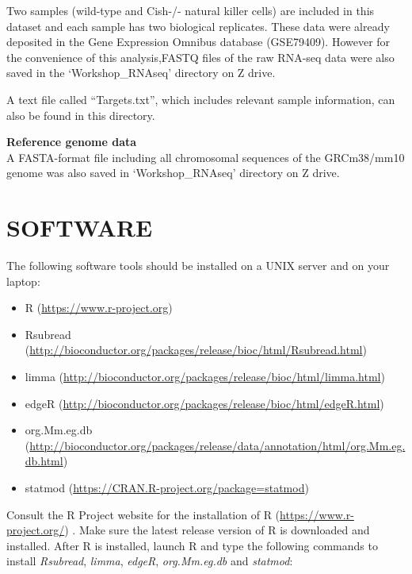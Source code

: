 \documentclass[]{book}
\providecommand{\tightlist}{%
  \setlength{\itemsep}{0pt}\setlength{\parskip}{0pt}}
\begin{document}
Two samples (wild-type and Cish-/- natural killer cells) are included in this dataset and each sample has two biological replicates. These data were already deposited in the Gene Expression Omnibus database (GSE79409). However for the convenience of this analysis,FASTQ files of the raw RNA-seq data were also saved in the `Workshop\_RNAseq' directory on Z drive.

A text file called ``Targets.txt'', which includes relevant sample information, can also be found in this directory.

\textbf{Reference genome data}\\

A FASTA-format file including all chromosomal sequences of the GRCm38/mm10 genome was also saved in `Workshop\_RNAseq' directory on Z drive.

\hypertarget{software}{%
\section{SOFTWARE}\label{software}}

The following software tools should be installed on a UNIX server and on your laptop:

\begin{itemize}
\tightlist
\item
  R (\url{https://www.r-project.org})
\item
  Rsubread (\url{http://bioconductor.org/packages/release/bioc/html/Rsubread.html})
\item
  limma (\url{http://bioconductor.org/packages/release/bioc/html/limma.html})
\item
  edgeR (\url{http://bioconductor.org/packages/release/bioc/html/edgeR.html})
\item
  org.Mm.eg.db (\url{http://bioconductor.org/packages/release/data/annotation/html/org.Mm.eg.db.html})
\item
  statmod (\url{https://CRAN.R-project.org/package=statmod})
\end{itemize}

Consult the R Project website for the installation of R (\url{https://www.r-project.org/}) \citep{R-base}. Make sure the latest release version of R is downloaded and installed. After R is installed, launch R and type the following commands to install \emph{Rsubread}, \emph{limma}, \emph{edgeR}, \emph{org.Mm.eg.db} and \emph{statmod}:
\end{document}
